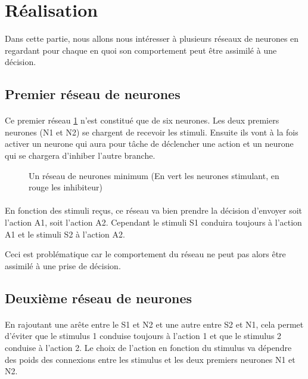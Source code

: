 \section{Réalisation}
Dans cette partie, nous allons nous intéresser à plusieurs réseaux de neurones
en regardant pour chaque en quoi son comportement peut être assimilé à une 
décision.


\subsection{Premier réseau de neurones}
\paragraph{}
Ce premier réseau \ref{reseau1} n'est constitué que de six neurones. Les deux
premiers neurones (N1 et N2) se chargent de recevoir les stimuli. Ensuite ils 
vont à la fois activer un neurone qui aura pour tâche de déclencher une 
action et un neurone qui se chargera d'inhiber l'autre branche. 

\begin{figure}[!h]
  \begin{center}
    
  \end{center}
  \caption{Un réseau de neurones minimum (En vert les neurones stimulant, en rouge les inhibiteur)}
  \label{reseau1}
\end{figure}

\paragraph{}
En fonction des stimuli reçus, ce réseau va bien prendre la décision 
d'envoyer soit l'action A1, soit l'action A2. Cependant le 
stimuli S1 conduira toujours à l'action A1 et le stimuli S2 à 
l'action A2.

Ceci est problématique car le comportement du réseau ne peut pas 
alors être assimilé à une prise de décision.

\subsection{Deuxième réseau de neurones}
\paragraph{}
En rajoutant une arête entre le S1 et N2 et une autre entre S2 et N1, cela
permet d'éviter que le stimulus 1 conduise toujours à l'action 1 et que le
stimulus 2 conduise à l'action 2. Le choix de l'action en fonction du stimulus
va dépendre des poids des connexions entre les stimulus et les deux premiers
neurones N1 et N2.

